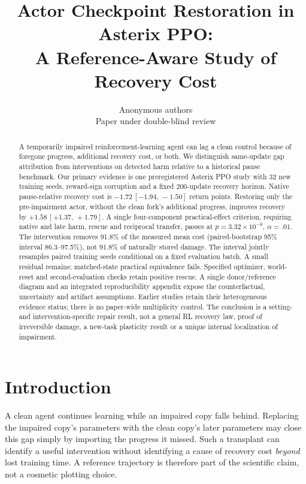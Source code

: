 \documentclass[10pt]{article}
\title{Actor Checkpoint Restoration in Asterix PPO:\\ A Reference-Aware Study of Recovery Cost}
\author{\name Anonymous authors \\
\addr Paper under double-blind review}
\newcommand{\ci}[2]{\,[#1,\,#2]}
\begin{document}
\maketitle
\begin{abstract}
A temporarily impaired reinforcement-learning agent can lag a clean control because of foregone progress, additional recovery cost, or both. We distinguish same-update gap attribution from interventions on detected harm relative to a historical pause benchmark. Our primary evidence is one preregistered Asterix PPO study with 32 new training seeds, reward-sign corruption and a fixed 200-update recovery horizon. Native pause-relative recovery cost is $-1.72\ci{-1.94}{-1.50}$ return points. Restoring only the pre-impairment actor, without the clean fork's additional progress, improves recovery by $+1.58\ci{+1.37}{+1.79}$. A single four-component practical-effect criterion, requiring native and late harm, rescue and reciprocal transfer, passes at $p=3.32\times10^{-8}$, $\alpha=.01$. The intervention removes 91.8\% of the measured mean cost (paired-bootstrap 95\% interval 86.3--97.5\%), not 91.8\% of naturally stored damage. The interval jointly resamples paired training seeds conditional on a fixed evaluation batch. A small residual remains; matched-state practical equivalence fails. Specified optimizer, world-reset and second-evaluation checks retain positive rescue. A single donor/reference diagram and an integrated reproducibility appendix expose the counterfactual, uncertainty and artifact assumptions. Earlier studies retain their heterogeneous evidence status; there is no paper-wide multiplicity control. The conclusion is a setting- and intervention-specific repair result, not a general RL recovery law, proof of irreversible damage, a new-task plasticity result or a unique internal localization of impairment.
\end{abstract}

\section{Introduction}
A clean agent continues learning while an impaired copy falls behind. Replacing the impaired copy's parameters with the clean copy's later parameters may close this gap simply by importing the progress it missed. Such a transplant can identify a useful intervention without identifying a cause of recovery cost \emph{beyond} lost training time. A reference trajectory is therefore part of the scientific claim, not a cosmetic plotting choice.
\end{document}

